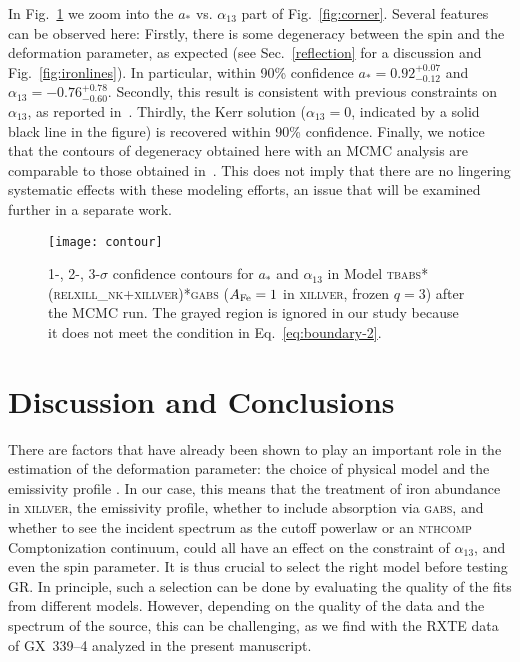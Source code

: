 \documentclass[11pt,a4paper,pdftex]{article}
\begin{document}
In Fig.~\ref{fig:contour} we zoom into the $a_*$ vs. $\alpha_{13}$ part of Fig.~\ref{fig:corner}. Several features can be observed here: Firstly, there is some  degeneracy between the spin and the deformation parameter, as expected (see Sec.~\ref{reflection} for a discussion and Fig.~\ref{fig:ironlines}). In particular, within 90\% confidence $a_*=0.92^{+0.07}_{-0.12}$ and $\alpha_{13}=-0.76^{+0.78}_{-0.60}$. Secondly, this result is consistent with previous constraints on $\alpha_{13}$, as reported in~\cite{bh5,ashutosh}. Thirdly, the Kerr solution ($\alpha_{13}=0$, indicated by a solid black line in the figure) is recovered within 90\% confidence. Finally, we notice that the contours of degeneracy obtained here with an MCMC analysis are comparable to those obtained in~\cite{bh5,ashutosh}. This does not imply that there are no lingering systematic effects with these modeling efforts, an issue that will be examined further in a separate work.



\begin{figure}[t]
\begin{center}
\texttt{[image: contour]}
\end{center}
\vspace{-0.5cm}
\caption{1-, 2-, 3-$\sigma$ confidence contours for $a_*$ and $\alpha_{13}$ in Model \textsc{tbabs*(relxill\_nk+xillver)*gabs} ($A_{\rm Fe}=1$ in \textsc{xillver}, frozen $q=3$) after the MCMC run. The grayed region is ignored in our study because it does not meet the condition in Eq.~\ref{eq:boundary-2}. \label{fig:contour}}
\end{figure}




\section{Discussion and Conclusions}\label{conclusion}

There are factors that have already been shown to play an important role in the estimation of the deformation parameter: the choice of physical model and the emissivity profile \citep{xu2018study, zhang2019kerr,liu19nk,zhang19nk}. In our case, this means that the treatment of iron abundance in \textsc{xillver}, the emissivity profile, whether to include absorption via \textsc{gabs}, and whether to see the incident spectrum as the cutoff powerlaw or an \textsc{nthcomp} Comptonization continuum, could all have an effect on the constraint of $\alpha_{13}$, and even the spin parameter. It is thus crucial to select the right model before testing GR. In principle, such a selection can be done by evaluating the quality of the fits from different models. However, depending on the quality of the data and the spectrum of the source, this can be challenging, as we find with the RXTE data of GX~339--4 analyzed in the present manuscript.
\end{document}
